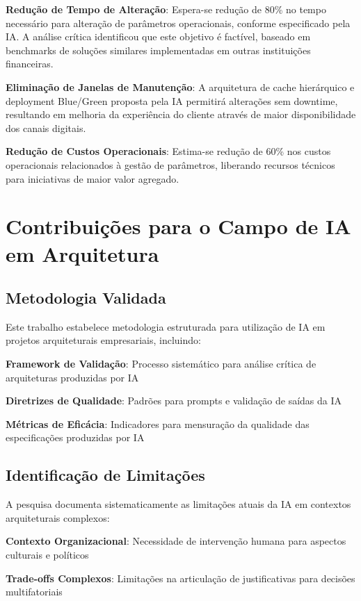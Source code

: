 \textbf{Redução de Tempo de Alteração}: Espera-se redução de 80\% no tempo necessário para alteração de parâmetros operacionais, conforme especificado pela IA. A análise crítica identificou que este objetivo é factível, baseado em benchmarks de soluções similares implementadas em outras instituições financeiras.

\textbf{Eliminação de Janelas de Manutenção}: A arquitetura de cache hierárquico e deployment Blue/Green proposta pela IA permitirá alterações sem downtime, resultando em melhoria da experiência do cliente através de maior disponibilidade dos canais digitais.

\textbf{Redução de Custos Operacionais}: Estima-se redução de 60\% nos custos operacionais relacionados à gestão de parâmetros, liberando recursos técnicos para iniciativas de maior valor agregado.

\section{Contribuições para o Campo de IA em Arquitetura}

\subsection{Metodologia Validada}

Este trabalho estabelece metodologia estruturada para utilização de IA em projetos arquiteturais empresariais, incluindo:

\textbf{Framework de Validação}: Processo sistemático para análise crítica de arquiteturas produzidas por IA

\textbf{Diretrizes de Qualidade}: Padrões para prompts e validação de saídas da IA

\textbf{Métricas de Eficácia}: Indicadores para mensuração da qualidade das especificações produzidas por IA

\subsection{Identificação de Limitações}

A pesquisa documenta sistematicamente as limitações atuais da IA em contextos arquiteturais complexos:

\textbf{Contexto Organizacional}: Necessidade de intervenção humana para aspectos culturais e políticos

\textbf{Trade-offs Complexos}: Limitações na articulação de justificativas para decisões multifatoriais

